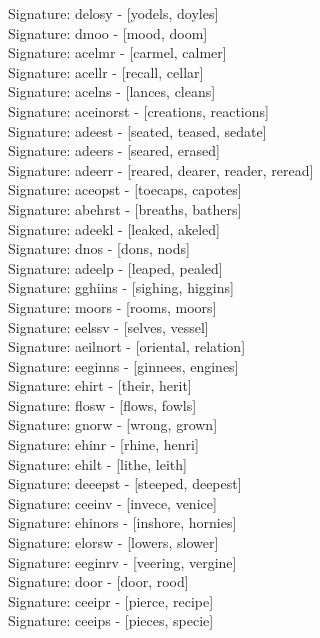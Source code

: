 Signature: {delosy} - [yodels, doyles] \\
Signature: {dmoo} - [mood, doom] \\
Signature: {acelmr} - [carmel, calmer] \\
Signature: {acellr} - [recall, cellar] \\
Signature: {acelns} - [lances, cleans] \\
Signature: {aceinorst} - [creations, reactions] \\
Signature: {adeest} - [seated, teased, sedate] \\
Signature: {adeers} - [seared, erased] \\
Signature: {adeerr} - [reared, dearer, reader, reread] \\
Signature: {aceopst} - [toecaps, capotes] \\
Signature: {abehrst} - [breaths, bathers] \\
Signature: {adeekl} - [leaked, akeled] \\
Signature: {dnos} - [dons, nods] \\
Signature: {adeelp} - [leaped, pealed] \\
Signature: {gghiins} - [sighing, higgins] \\
Signature: {moors} - [rooms, moors] \\
Signature: {eelssv} - [selves, vessel] \\
Signature: {aeilnort} - [oriental, relation] \\
Signature: {eeginns} - [ginnees, engines] \\
Signature: {ehirt} - [their, herit] \\
Signature: {flosw} - [flows, fowls] \\
Signature: {gnorw} - [wrong, grown] \\
Signature: {ehinr} - [rhine, henri] \\
Signature: {ehilt} - [lithe, leith] \\
Signature: {deeepst} - [steeped, deepest] \\
Signature: {ceeinv} - [invece, venice] \\
Signature: {ehinors} - [inshore, hornies] \\
Signature: {elorsw} - [lowers, slower] \\
Signature: {eeginrv} - [veering, vergine] \\
Signature: {door} - [door, rood] \\
Signature: {ceeipr} - [pierce, recipe] \\
Signature: {ceeips} - [pieces, specie] \\
